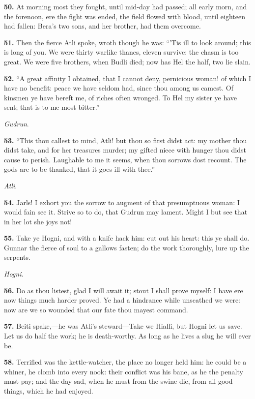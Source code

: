 \textbf{50.} At morning most they fought, until mid-day had passed; all early
morn, and the forenoon, ere the fight was ended, the field flowed with
blood, until eighteen had fallen: Bera's two sons, and her brother,
had them overcome.

\textbf{51.} Then the fierce Atli spoke, wroth though he was: ``'Tis ill to
look around; this is long of you. We were thirty warlike thanes,
eleven survive: the chasm is too great. We were five brothers, when
Budli died; now has Hel the half, two lie slain.

\textbf{52.} ``A great affinity I obtained, that I cannot deny, pernicious
woman! of which I have no benefit: peace we have seldom had, since
thou among us camest. Of kinsmen ye have bereft me, of riches often
wronged. To Hel my sister ye have sent; that is to me most bitter.''

\emph{Gudrun}.

\textbf{53.} ``This thou callest to mind, Atli! but thou so first didst act:
my mother thou didst take, and for her treasures murder; my gifted
niece with hunger thou didst cause to perish. Laughable to me it
seems, when thou sorrows dost recount. The gods are to be thanked,
that it goes ill with thee.''

\emph{Atli}.

\textbf{54.} Jarls! I exhort you the sorrow to augment of that presumptuous
woman: I would fain see it. Strive so to do, that Gudrun may lament.
Might I but see that in her lot she joys not!

\textbf{55.} Take ye Hogni, and with a knife hack him: cut out his heart:
this ye shall do. Gunnar the fierce of soul to a gallows fasten; do
the work thoroughly, lure up the serpents.

\emph{Hogni}.

\textbf{56.} Do as thou listest, glad I will await it; stout I shall prove
myself: I have ere now things much harder proved. Ye had a hindrance
while unscathed we were: now are we so wounded that our fate thou
mayest command.

\textbf{57.} Beiti spake,—he was Atli's steward—Take we Hialli, but Hogni
let us save. Let us do half the work; he is death-worthy. As long as
he lives a slug he will ever be.

\textbf{58.} Terrified was the kettle-watcher, the place no longer held him:
he could be a whiner, he clomb into every nook: their conflict was his
bane, as he the penalty must pay; and the day sad, when he must from
the swine die, from all good things, which he had enjoyed.

